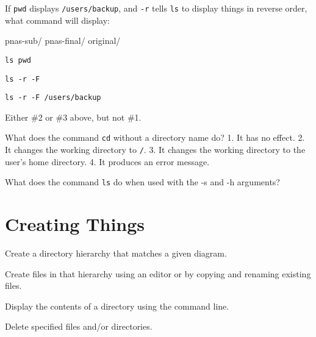 \begin{challenge}

  If \texttt{pwd} displays \texttt{/users/backup}, and \texttt{-r} tells
  \texttt{ls} to display things in reverse order, what command will
  display:

\begin{VerbOut}
pnas-sub/ pnas-final/ original/
\end{VerbOut}

\begin{swcenumerate}
\item
  \texttt{ls pwd}
\item
  \texttt{ls -r -F}
\item
  \texttt{ls -r -F /users/backup}
\item
  Either \#2 or \#3 above, but not \#1.
\end{swcenumerate}

\end{challenge}

\begin{challenge}

  What does the command \texttt{cd} without a directory name do? 1. It has
  no effect. 2. It changes the working directory to \texttt{/}. 3. It
  changes the working directory to the user's home directory. 4. It
  produces an error message.

\end{challenge}

\begin{challenge}

  What does the command \texttt{ls} do when used with the -s and -h
  arguments?

\end{challenge}

\section{Creating Things}

\begin{objectives}
\begin{swcitemize}
\item
  Create a directory hierarchy that matches a given diagram.
\item
  Create files in that hierarchy using an editor or by copying and
  renaming existing files.
\item
  Display the contents of a directory using the command line.
\item
  Delete specified files and/or directories.
\end{swcitemize}
\end{objectives}

